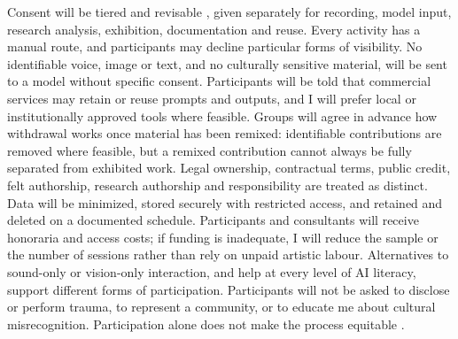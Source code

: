 Consent will be tiered and revisable \citep{strengers2021}, given separately
for recording, model input, research analysis, exhibition, documentation and
reuse. Every activity has a manual route, and participants may decline
particular forms of visibility. No identifiable voice, image or text, and no
culturally sensitive material, will be sent to a model without specific
consent. Participants will be told that commercial services may retain or
reuse prompts and outputs, and I will prefer local or institutionally
approved tools where feasible. Groups will agree in advance how withdrawal works once material has
been remixed: identifiable contributions are removed where feasible, but a
remixed contribution cannot always be fully separated from exhibited work.
Legal ownership, contractual terms, public credit, felt authorship, research
authorship and responsibility are treated as distinct. Data will be
minimized, stored securely with restricted access, and retained and deleted
on a documented schedule. Participants and consultants will receive
honoraria and access costs; if funding is inadequate, I will reduce the
sample or the number of sessions rather than rely on unpaid artistic labour.
Alternatives to sound-only or vision-only interaction, and
help at every level of AI literacy, support different forms of
participation. Participants will not
be asked to disclose or perform trauma, to represent a community, or to
educate me about cultural misrecognition. Participation alone does not make
the process equitable \citep{birhane2022}.

